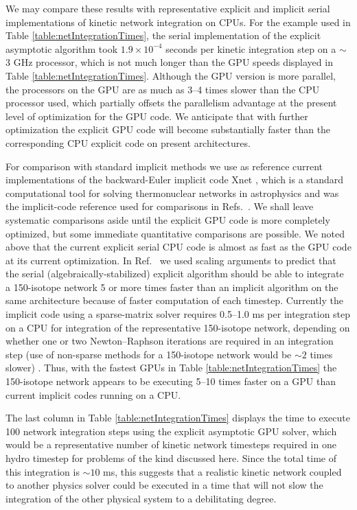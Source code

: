 \documentclass[]{elsart}
\begin{document}
We may compare these results with representative explicit and implicit serial 
implementations of kinetic network integration on CPUs.  For the example used in 
Table \ref{table:netIntegrationTimes}, the serial implementation of the explicit 
asymptotic  algorithm \cite{guidAsy} took $1.9 \times 10^{-4}$ seconds per 
kinetic integration step on a $\sim$ 3 GHz processor, which is not much longer 
than the GPU speeds displayed in Table \ref{table:netIntegrationTimes}.  
Although the GPU version is more parallel, the processors on the GPU are as much 
as 3--4 times slower than the CPU processor used, which partially offsets the 
parallelism advantage at the present level of optimization for the GPU code. We 
anticipate that with further optimization the explicit GPU code will become 
substantially faster than the corresponding CPU explicit code on present 
architectures.

For comparison with standard implicit methods we use as reference current  
implementations of the backward-Euler implicit code Xnet \cite{raphcode}, which 
is a standard computational tool for solving thermonuclear networks in 
astrophysics and was the implicit-code reference used for comparisons in Refs.\ 
\cite{guidJCP,guidAsy,guidQSS,guidPE}. We shall leave systematic comparisons 
aside until the explicit GPU code is more completely optimized, but some 
immediate quantitative comparisons are possible. We noted above that the 
current explicit serial CPU code is almost as fast as the GPU code at its 
current optimization.  In Ref.\ \cite{guidAsy} we used scaling arguments to 
predict that the serial (algebraically-stabilized) explicit algorithm should be 
able to integrate a 150-isotope network 5 or more times faster than an implicit 
algorithm on the same architecture because of faster computation of each 
timestep.  Currently the implicit code using a sparse-matrix solver requires 
0.5--1.0 ms per integration step on a CPU for integration of the representative 
150-isotope network, depending on whether one or two Newton--Raphson iterations 
are required in an integration step (use of non-sparse methods for a 150-isotope 
network would be $\sim 2$ times slower) \cite{harrisPrivate}.     Thus, with the 
fastest GPUs in Table \ref{table:netIntegrationTimes} the 150-isotope network 
appears to be executing 5--10 times faster on a GPU than current implicit codes 
running on a CPU.   

The last column in Table \ref{table:netIntegrationTimes} displays the time to 
execute 100 network integration steps using the explicit asymptotic GPU solver, 
which would be a representative number of kinetic network timesteps required in 
one hydro timestep for problems of the kind discussed here.
Since the total time of this integration is $\sim 10$ ms, this suggests that a
realistic kinetic network coupled to another physics solver could be
executed in a time that will not slow the integration of the other physical
system to a debilitating degree.
\end{document}
